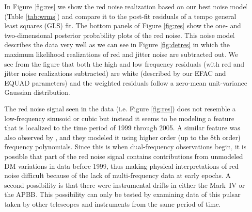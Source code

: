 In Figure \ref{fig:res} we show the red noise realization based on our best
noise model (Table \ref{tab:wrms}) and compare it to the post-fit residuals of
a {\sc tempo} general least squares (GLS) fit.
The bottom
panels of Figure \ref{fig:res} show the one- and two-dimensional posterior probability plots
of the red noise. This noise model describes the data very well as we can see in Figure \ref{fig:detres} in which the maximum likelihood realizations of red and jitter noise are subtracted out. We see from the figure that both the high and low frequency residuals (with red and jitter noise realizations subtracted) are white (described by our EFAC and EQUAD parameters) and the weighted residuals follow a zero-mean unit-variance Gaussian distribution.



The red noise signal seen in the data (i.e. Figure \ref{fig:res}) does not
resemble a low-frequency sinusoid or cubic
but instead it seems to be modeling a feature that is
localized to the time period of 1999 through 2005. 
A similar feature was also observed by \citet{sns+05}, and they modeled it
using higher order (up to the 8th order) frequency polynomials.
Since this is when
dual-frequency observations begin, it is possible that part of the red noise
signal contains contributions from unmodeled DM variations in data before 1999, 
thus making physical interpretations of red noise difficult because of the lack of multi-frequency data at early epochs.
A second possibility is that there were instrumental drifts in either the
Mark~IV or the APBB. This possibility can only be tested by examining data of
this pulsar taken by other telescopes and instruments from the same period of
time. 

